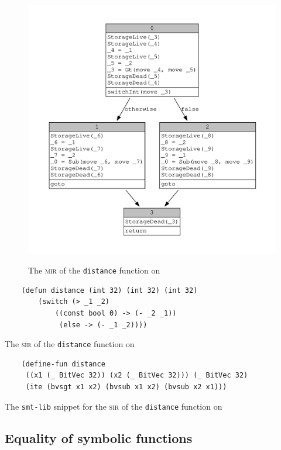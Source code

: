 \begin{figure}[ht]
    \centering
    \includegraphics[height=12cm]{images/distance.pdf}
    \caption{The \textsc{mir} of the \texttt{distance} function on }
  \label{lst:mir_sire_example}
\end{figure}

\begin{listing}[ht]
    \begin{verbatim}
    (defun distance (int 32) (int 32) (int 32) 
        (switch (> _1 _2) 
            ((const bool 0) -> (- _2 _1)) 
             (else -> (- _1 _2))))
    \end{verbatim}
    \caption{The \textsc{sir} of the \texttt{distance} function on }
  \label{lst:sir_sire_example}
\end{listing}

\begin{listing}[ht]
    \begin{verbatim}
    (define-fun distance 
     ((x1 (_ BitVec 32)) (x2 (_ BitVec 32))) (_ BitVec 32) 
     (ite (bvsgt x1 x2) (bvsub x1 x2) (bvsub x2 x1)))
    \end{verbatim}
    \caption{The \texttt{smt-lib} snippet for the \textsc{sir} of the \texttt{distance} function on }
  \label{lst:smt_sire_example}
\end{listing}


\subsection{Equality of symbolic functions}

